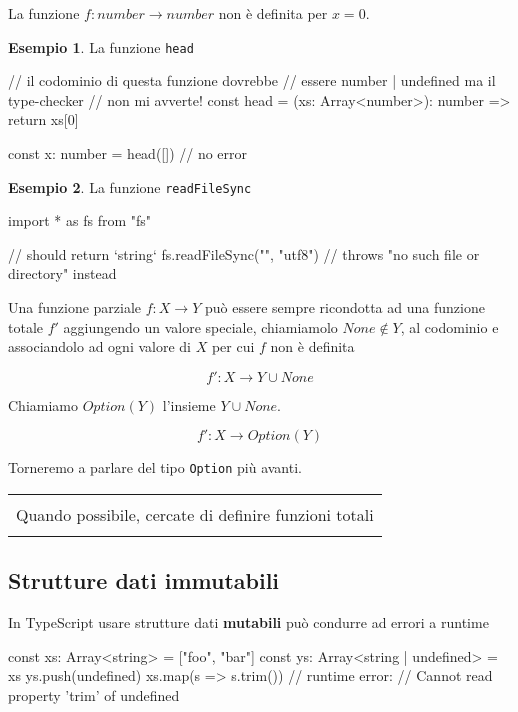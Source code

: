 \documentclass[12pt]{article}
\theoremstyle{definition}
\newtheorem{example}{Esempio}[subsection]
\newenvironment{boxed}
    {\begin{center}
    \begin{tabular}{|p{0.9\textwidth}|}
    \hline\\
    }
    {
    \\\\\hline
    \end{tabular}
    \end{center}
    }
\newenvironment{code}
  {\vspace{0.5cm} \VerbatimEnvironment\begin{typescriptcode}}
  {\end{typescriptcode} \vspace{0.2cm}}
\begin{document}
La funzione $f: number \rightarrow number$ non è definita per $x = 0$.

\begin{example}
La funzione \texttt{head}

\begin{code}
// il codominio di questa funzione dovrebbe
// essere number | undefined ma il type-checker
// non mi avverte!
const head = (xs: Array<number>): number => {
  return xs[0]
}

const x: number = head([]) // no error
\end{code}
\end{example}

\begin{example}
La funzione \texttt{readFileSync}

\begin{code}
import * as fs from "fs"

// should return `string`
fs.readFileSync("", "utf8")
// throws "no such file or directory" instead
\end{code}
\end{example}

Una funzione parziale $f: X \rightarrow Y$ può essere sempre ricondotta ad una funzione totale $f'$ aggiungendo un valore speciale,
chiamiamolo $None \notin Y$, al codominio e associandolo ad ogni valore di $X$ per cui $f$ non è definita

$$
f': X \rightarrow Y \cup None
$$

Chiamiamo $Option(Y)$ l'insieme $Y \cup None$.

$$
f': X \rightarrow Option(Y)
$$

Torneremo a parlare del tipo \texttt{Option} più avanti.

\begin{boxed}
Quando possibile, cercate di definire funzioni totali
\end{boxed}

\subsection{Strutture dati immutabili}

In TypeScript usare strutture dati \textbf{mutabili} può condurre ad errori a runtime

\begin{code}
const xs: Array<string> = ["foo", "bar"]
const ys: Array<string | undefined> = xs
ys.push(undefined)
xs.map(s => s.trim())
// runtime error:
// Cannot read property 'trim' of undefined
\end{code}
\end{document}
